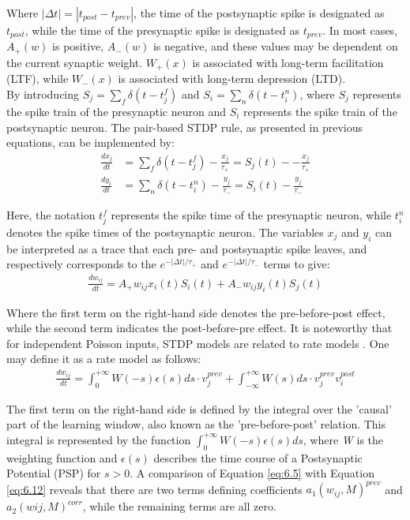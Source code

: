 \noindent Where $\left| \Delta t \right| = \left| t_{post} - t_{prev} \right|$, the time of the postsynaptic spike is designated as $t_{post}$, while the time of the presynaptic spike is designated as $t_{prev}$. In most cases, $A_+(w)$ is positive, $A_-(w)$ is negative, and these values may be dependent on the current synaptic weight. $W_+ (x)$ is associated with long-term facilitation (LTF), while $W_- (x)$ is associated with long-term depression (LTD). \\

\noindent By introducing $S_j = \sum_{f}^{} \delta\left( t - t_j^f \right) $ and $S_i = \sum_{n}^{} \delta\left( t - t_i^n \right) $,  where $S_j$ represents the spike train of the presynaptic neuron and $S_i$ represents the spike train of the postsynaptic neuron. The pair-based STDP rule, as presented in previous equations, can be implemented by:
\begin{align}
\frac{dx_j}{dt} &= \sum_{f}^{}\delta\left( t - t_j^f \right) - \frac{x_j}{\tau_+} = S_j(t) - - \frac{x_j}{\tau_+} \label{eq:6.9} \\
\frac{dy_i}{dt} &= \sum_{n}^{}\delta\left( t - t_i^n \right) - \frac{y_j}{\tau_-} = S_i(t) - \frac{y_j}{\tau_-} \label{eq:6.10} 
\end{align}

\noindent Here, the notation $t_j^f$ represents the spike time of the presynaptic neuron, while $t_i^n$ denotes the spike times of the postsynaptic neuron. The variables $x_j$ and $y_i$ can be interpreted as a trace that each pre- and postsynaptic spike leaves, and respectively corresponds to the $e^{-\left| \Delta t \right| / \tau_+} $ and $e^{-\left| \Delta t \right| / \tau_-}$ terms to give:
\begin{align}
\frac{dw_{ij}}{dt} = A_+ w_{ij}x_i(t)S_i(t) + A_-w_{ij}y_i(t)S_j(t) \label{eq:6.11} 
\end{align}

\noindent Where the first term on the right-hand side denotes the pre-before-post effect, while the second term indicates the post-before-pre effect. It is noteworthy that for independent Poisson inputs, STDP models are related to rate models \cite{gerstner2014neuronal}. One may define it as a rate model as follows:
\begin{align}
\frac{dw_{ij}}{dt} = \int_{0}^{+\infty } W(-s)\epsilon(s)ds\cdot v_{j}^{prev} + \int_{-\infty }^{+\infty } W(s)ds \cdot v_j^{prev}v_i^{post} \label{eq:6.12}
\end{align}


\noindent The first term on the right-hand side is defined by the integral over the 'causal' part of the learning window, also known as the 'pre-before-post' relation. This integral is represented by the function $\int_{0}^{+\infty } W(-s)\epsilon(s)ds$, where \textit{W} is the weighting function and $\epsilon (s)$ describes the time course of a Postsynaptic Potential (PSP) for $s > 0$. A comparison of Equation \ref{eq:6.5} with Equation \ref{eq:6.12} reveals that there are two terms defining coefficients $a_1(w_{ij},M)^{prev}$ and $a_2(wij,M)^{corr}$, while the remaining terms are all zero. \\

